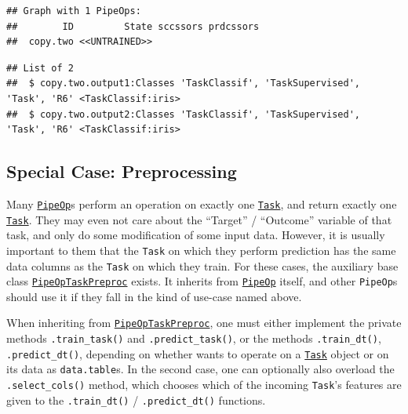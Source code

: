 \documentclass[
]{scrbook}
\newenvironment{Shaded}{\begin{snugshade}}{\end{snugshade}}
\newcommand{\FunctionTok}[1]{\textcolor[rgb]{0.00,0.00,0.00}{#1}}
\newcommand{\NormalTok}[1]{#1}
\newcommand{\OtherTok}[1]{\textcolor[rgb]{0.56,0.35,0.01}{#1}}
\newcommand{\SpecialCharTok}[1]{\textcolor[rgb]{0.00,0.00,0.00}{#1}}
\renewenvironment{Shaded} {\begin{snugshade}\small} {\end{snugshade}}
\begin{document}
\begin{verbatim}
## Graph with 1 PipeOps:
##        ID         State sccssors prdcssors
##  copy.two <<UNTRAINED>>
\end{verbatim}

\begin{Shaded}
\end{Shaded}

\begin{verbatim}
## List of 2
##  $ copy.two.output1:Classes 'TaskClassif', 'TaskSupervised', 'Task', 'R6' <TaskClassif:iris> 
##  $ copy.two.output2:Classes 'TaskClassif', 'TaskSupervised', 'Task', 'R6' <TaskClassif:iris>
\end{verbatim}

\hypertarget{ext-pipe-preproc}{%
\subsection{Special Case: Preprocessing}\label{ext-pipe-preproc}}

Many \href{https://mlr3pipelines.mlr-org.com/reference/PipeOp.html}{\texttt{PipeOp}}s perform an operation on exactly one \href{https://mlr3.mlr-org.com/reference/Task.html}{\texttt{Task}}, and return exactly one \href{https://mlr3.mlr-org.com/reference/Task.html}{\texttt{Task}}. They may even not care about the ``Target'' / ``Outcome'' variable of that task, and only do some modification of some input data.
However, it is usually important to them that the \texttt{Task} on which they perform prediction has the same data columns as the \texttt{Task} on which they train.
For these cases, the auxiliary base class \href{https://mlr3pipelines.mlr-org.com/reference/PipeOpTaskPreproc.html}{\texttt{PipeOpTaskPreproc}} exists.
It inherits from \href{https://mlr3pipelines.mlr-org.com/reference/PipeOp.html}{\texttt{PipeOp}} itself, and other \texttt{PipeOp}s should use it if they fall in the kind of use-case named above.

When inheriting from \href{https://mlr3pipelines.mlr-org.com/reference/PipeOpTaskPreproc.html}{\texttt{PipeOpTaskPreproc}}, one must either implement the private methods \texttt{.train\_task()} and \texttt{.predict\_task()}, or the methods \texttt{.train\_dt()}, \texttt{.predict\_dt()}, depending on whether wants to operate on a \href{https://mlr3.mlr-org.com/reference/Task.html}{\texttt{Task}} object or on its data as \texttt{data.table}s.
In the second case, one can optionally also overload the \texttt{.select\_cols()} method, which chooses which of the incoming \texttt{Task}'s features are given to the \texttt{.train\_dt()} / \texttt{.predict\_dt()} functions.
\end{document}
